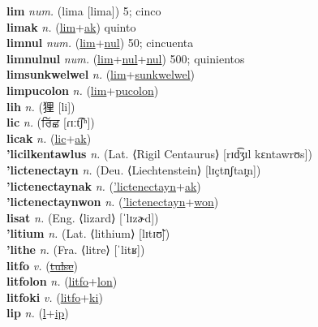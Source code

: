 \textbf{lim} \textit{num.} ({\javanese{}lima} [lima])
5; cinco \label{lim} \\
\textbf{limak} \textit{n.} (\hyperref[lim]{lim}+\hyperref[ak]{ak})
quinto \label{limak} \\
\textbf{limnul} \textit{num.} (\hyperref[lim]{lim}+\hyperref[nul]{nul})
50; cincuenta \label{limnul} \\
\textbf{limnulnul} \textit{num.} (\hyperref[lim]{lim}+\hyperref[nul]{nul}+\hyperref[nul]{nul})
500; quinientos \label{limnulnul} \\
\textbf{limsunkwelwel} \textit{n.} (\hyperref[lim]{lim}+\hyperref[sunkwelwel]{sunkwelwel})
 \label{limsunkwelwel} \\
\textbf{limpucolon} \textit{n.} (\hyperref[lim]{lim}+\hyperref[pucolon]{pucolon})
 \label{limpucolon} \\
\textbf{lih} \textit{n.} ({\chinese{}狸} [li])
 \label{lih} \\
\textbf{lic} \textit{n.} ({\gurmukhi{}ਰਿੱਛ} [ɾɪːt͡ʃʰ])
 \label{lic} \\
\textbf{licak} \textit{n.} (\hyperref[lic]{lic}+\hyperref[ak]{ak})
 \label{licak} \\
\textbf{'licilkentawlus} \textit{n.} (Lat. ⟨Rigil Centaurus⟩ [rɪd͡ʒɪl kɛntawrʊs])
 \label{'licilkentawlus} \\
\textbf{'lictenectayn} \textit{n.} (Deu. ⟨Liechtenstein⟩ [lɪçtn̩ʃtaɪ̯n])
 \label{'lictenectayn} \\
\textbf{'lictenectaynak} \textit{n.} (\hyperref['lictenectayn]{'lictenectayn}+\hyperref[ak]{ak})
 \label{'lictenectaynak} \\
\textbf{'lictenectaynwon} \textit{n.} (\hyperref['lictenectayn]{'lictenectayn}+\hyperref[won]{won})
 \label{'lictenectaynwon} \\
\textbf{lisat} \textit{n.} (Eng. ⟨lizard⟩ [ˈlɪzɚd])
 \label{lisat} \\
\textbf{'litium} \textit{n.} (Lat. ⟨lithium⟩ [lɪtɪʊ̃])
 \label{'litium} \\
\textbf{'lithe} \textit{n.} (Fra. ⟨litre⟩ [ˈlitʁ])
 \label{'lithe} \\
\textbf{litfo} \textit{v.} (\hyperref[tulse]{\sout{tulse}})
 \label{litfo} \\
\textbf{litfolon} \textit{n.} (\hyperref[litfo]{litfo}+\hyperref[lon]{lon})
 \label{litfolon} \\
\textbf{litfoki} \textit{v.} (\hyperref[litfo]{litfo}+\hyperref[ki]{ki})
 \label{litfoki} \\
\textbf{lip} \textit{n.} (\hyperref[l]{l}+\hyperref[ip]{ip})
